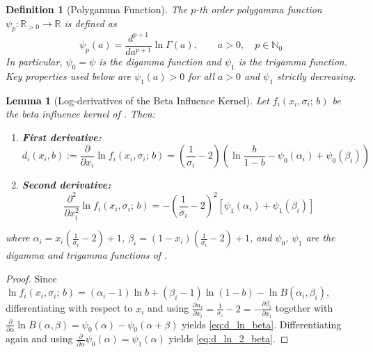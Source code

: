 \documentclass{article}
\newtheorem{definition}{Definition}
\newtheorem{lemma}[theorem]{Lemma}
\begin{document}
                \begin{definition}[Polygamma Function]\label{def:polygamma}
                    The $p$-th order polygamma function $\psi_p : \mathbb{R}_{>0} \to \mathbb{R}$ is defined as
                    \begin{equation}
                        \psi_p(a) = \frac{d^{p+1}}{da^{p+1}}\ln\Gamma(a), \qquad a > 0,\quad p \in \mathbb{N}_0
                    \end{equation}
                    In particular, $\psi_0 = \psi$ is the digamma function and $\psi_1$ is the trigamma function. Key properties used below are $\psi_1(a) > 0$ for all $a > 0$ and $\psi_1$ strictly decreasing.
                \end{definition}

                \begin{lemma}[Log-derivatives of the Beta Influence Kernel]\label{lem:SI_beta_log_derivs}
                    Let $f_i(x_i,\sigma_i;\,b)$ be the beta influence kernel of . Then:
                    \begin{enumerate}
                        \item \textbf{First derivative:}
                        \begin{equation}\label{eq:d_ln_beta}
                            d_i(x_i, b) := \frac{\partial}{\partial x_i}\ln f_i(x_i,\sigma_i;\,b) = \left(\frac{1}{\sigma_i}-2\right)\left(\ln\frac{b}{1-b} - \psi_0(\alpha_i) + \psi_0(\beta_i)\right)
                        \end{equation}
                        \item \textbf{Second derivative:}
                        \begin{equation}\label{eq:d_ln_2_beta}
                            \frac{\partial^2}{\partial x_i^2}\ln f_i(x_i,\sigma_i;\,b) = -\left(\frac{1}{\sigma_i}-2\right)^2\!\left[\psi_1(\alpha_i) + \psi_1(\beta_i)\right]
                        \end{equation}
                    \end{enumerate}
                    where $\alpha_i = x_i\!\left(\frac{1}{\sigma_i}-2\right)+1$, $\beta_i = (1-x_i)\!\left(\frac{1}{\sigma_i}-2\right)+1$, and $\psi_0$, $\psi_1$ are the digamma and trigamma functions of .
                \end{lemma}
                \begin{proof}
                    Since $\ln f_i(x_i,\sigma_i;\,b) = (\alpha_i-1)\ln b + (\beta_i-1)\ln(1-b) - \ln B(\alpha_i,\beta_i)$, differentiating with respect to $x_i$ and using $\frac{\partial \alpha_i}{\partial x_i} = \frac{1}{\sigma_i}-2 = -\frac{\partial \beta_i}{\partial x_i}$ together with $\frac{\partial}{\partial \alpha}\ln B(\alpha,\beta) = \psi_0(\alpha) - \psi_0(\alpha+\beta)$ yields \cref{eq:d_ln_beta}. Differentiating again and using $\frac{\partial}{\partial \alpha}\psi_0(\alpha) = \psi_1(\alpha)$ yields \cref{eq:d_ln_2_beta}.
                \end{proof}
\end{document}
